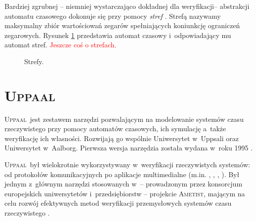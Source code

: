 \documentclass{pracamgr}
\newcommand{\todo}[1]{\textcolor{red}{#1}}
\newcommand{\upp}{\textsc{Uppaal}}
\theoremstyle{plain}
\begin{document}
Bardziej zgrubnej -- niemniej wystarczająco dokładnej dla
weryfikacji-- abstrakcji automatu czasowego dokonuje się przy pomocy
\emph{stref} \cite{henz-94}. Strefą nazywamy maksymalny zbiór
wartościowań zegarów spełniających koniunkcję ograniczeń zegarowych.
Rysunek \ref{img:zones} przedstawia automat czasowy i~odpowiadający mu
automat stref. \todo{Jeszcze coś o strefach.}

\begin{figure}
  \centering
   \hspace{1cm}
  \caption{Strefy.}
  \label{img:zones}
\end{figure}

\section{\upp}
\label{uppaal}

\upp\ jest zestawem narzędzi pozwalającym na modelowanie systemów czasu
rzeczywistego przy pomocy automatów czasowych, ich symulację a~także
weryfikację ich własności. Rozwijają go wspólnie Uniwersytet w~Uppsali
oraz Uniwersytet w~Aalborg. Pierwsza wersja narzędzia została wydana w~roku
1995 \cite{lpw:fct95}.

\upp\ był wielokrotnie wykorzystywany w~weryfikacji rzeczywistych
systemów: od protokołów komunikacyjnych po aplikacje multimedialne
(m.in. \cite{lp:prfts97}, \cite{lpw:tacas98},
\cite{DBLP:conf/icfem/BordbarO03},
\cite{Ravn:2011:MVW:1987389.1987431}). Był jednym z~głównym narzędzi
stosowanych w~-- prowadzonym przez konsorcjum europejskich
uniwersytetów i~przedsiębiorstw -- projekcie \textsc{Ametist}, mającym
na celu rozwój efektywnych metod weryfikacji przemysłowych systemów czasu
rzeczywistego \cite{AMETISTfinal}.
\end{document}
